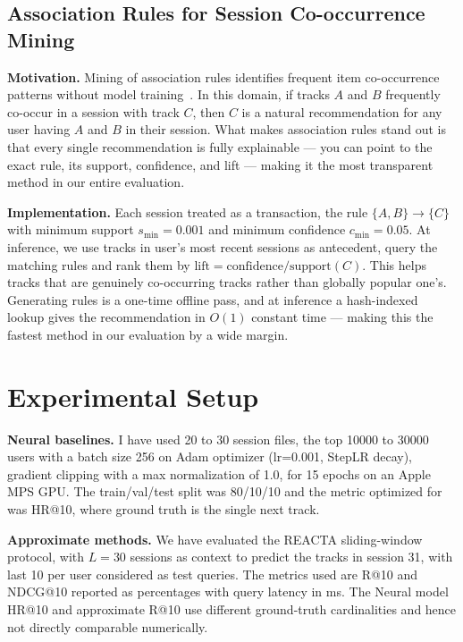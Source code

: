 \documentclass[conference]{IEEEtran}
\begin{document}
\subsection{Association Rules for Session Co-occurrence Mining}

\textbf{Motivation.} Mining of association rules identifies frequent item
co-occurrence patterns without model training~\cite{agrawal1994}. In this
domain, if tracks $A$ and $B$ frequently co-occur in a session with track $C$,
then $C$ is a natural recommendation for any user having $A$ and $B$ in their
session. What makes association rules stand out is that every single
recommendation is fully explainable --- you can point to the exact rule, its
support, confidence, and lift --- making it the most transparent method in
our entire evaluation.

\textbf{Implementation.} Each session treated as a transaction, the rule
$\{A, B\} \to \{C\}$ with minimum support $s_{\min} = 0.001$ and minimum
confidence $c_{\min} = 0.05$. At inference, we use tracks in user's most
recent sessions as antecedent, query the matching rules and rank them by
$\text{lift} = \text{confidence}/\text{support}(C)$. This helps tracks that
are genuinely co-occurring tracks rather than globally popular one's.
Generating rules is a one-time offline pass, and at inference a hash-indexed
lookup gives the recommendation in $O(1)$ constant time --- making this the
fastest method in our evaluation by a wide margin.

\section{Experimental Setup}

\textbf{Neural baselines.} I have used 20 to 30 session files, the top 10000
to 30000 users with a batch size 256 on Adam optimizer (lr=0.001, StepLR
decay), gradient clipping with a max normalization of 1.0, for 15 epochs on
an Apple MPS GPU. The train/val/test split was 80/10/10 and the metric
optimized for was HR@10, where ground truth is the single next track.

\textbf{Approximate methods.} We have evaluated the REACTA sliding-window
protocol, with $L=30$ sessions as context to predict the tracks in session
31, with last 10 per user considered as test queries. The metrics used are
R@10 and NDCG@10 reported as percentages with query latency in ms. The Neural
model HR@10 and approximate R@10 use different ground-truth cardinalities and
hence not directly comparable numerically.
\end{document}
